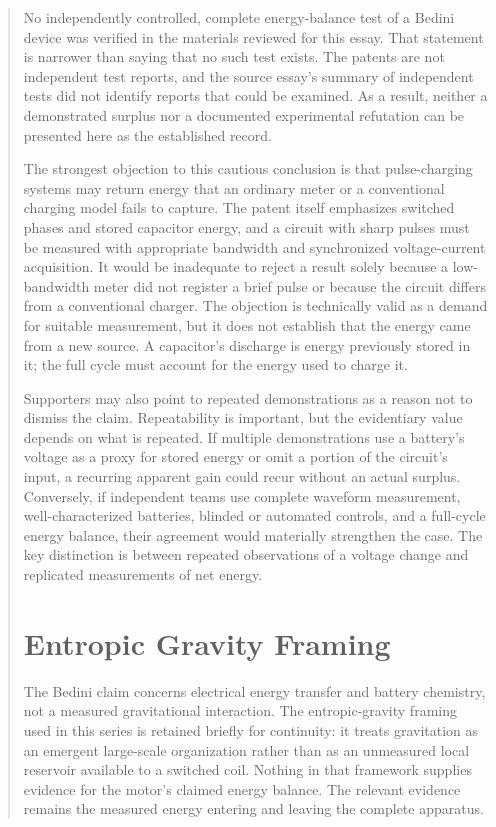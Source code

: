 \documentclass[11pt]{article}
\begin{document}
\begin{abstract}
No independently controlled, complete energy-balance test of a Bedini device was verified in the materials reviewed for this essay. That statement is narrower than saying that no such test exists. The patents are not independent test reports, and the source essay's summary of independent tests did not identify reports that could be examined. As a result, neither a demonstrated surplus nor a documented experimental refutation can be presented here as the established record.

The strongest objection to this cautious conclusion is that pulse-charging systems may return energy that an ordinary meter or a conventional charging model fails to capture. The patent itself emphasizes switched phases and stored capacitor energy, and a circuit with sharp pulses must be measured with appropriate bandwidth and synchronized voltage-current acquisition. It would be inadequate to reject a result solely because a low-bandwidth meter did not register a brief pulse or because the circuit differs from a conventional charger. The objection is technically valid as a demand for suitable measurement, but it does not establish that the energy came from a new source. A capacitor's discharge is energy previously stored in it; the full cycle must account for the energy used to charge it.

Supporters may also point to repeated demonstrations as a reason not to dismiss the claim. Repeatability is important, but the evidentiary value depends on what is repeated. If multiple demonstrations use a battery's voltage as a proxy for stored energy or omit a portion of the circuit's input, a recurring apparent gain could recur without an actual surplus. Conversely, if independent teams use complete waveform measurement, well-characterized batteries, blinded or automated controls, and a full-cycle energy balance, their agreement would materially strengthen the case. The key distinction is between repeated observations of a voltage change and replicated measurements of net energy.

\section{Entropic Gravity Framing}

The Bedini claim concerns electrical energy transfer and battery chemistry, not a measured gravitational interaction. The entropic-gravity framing used in this series is retained briefly for continuity: it treats gravitation as an emergent large-scale organization rather than as an unmeasured local reservoir available to a switched coil. Nothing in that framework supplies evidence for the motor's claimed energy balance. The relevant evidence remains the measured energy entering and leaving the complete apparatus.


\end{abstract}
\end{document}

